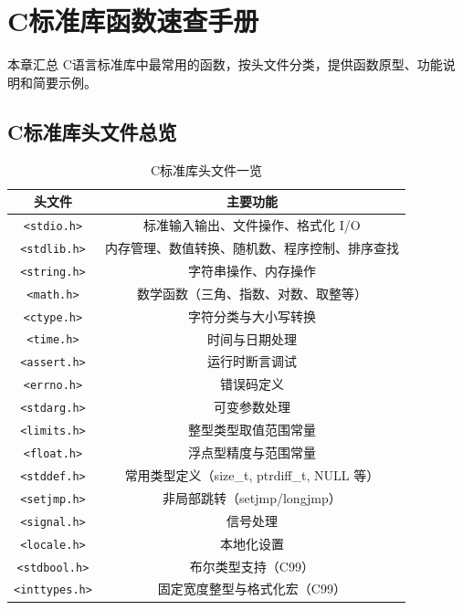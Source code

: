 \appendix
\clearpage
\begingroup
\let\clearpage\relax
\let\cleardoublepage\relax
\vspace*{\fill}
\chapter{C标准库函数速查手册}
\begin{center}
本章汇总 C语言标准库中最常用的函数，按头文件分类，提供函数原型、功能说明和简要示例。
\end{center}
\vspace*{\fill}
\endgroup
\clearpage


\section{C标准库头文件总览}

\begin{table}[H]
\centering
\small
\renewcommand{\arraystretch}{1.5}
\begin{tabulary}{\linewidth}{CC}
\toprule
\textbf{头文件} & \textbf{主要功能} \\ \midrule
\texttt{<stdio.h>} & 标准输入输出、文件操作、格式化 I/O \\ 
\texttt{<stdlib.h>} & 内存管理、数值转换、随机数、程序控制、排序查找 \\ 
\texttt{<string.h>} & 字符串操作、内存操作 \\ 
\texttt{<math.h>} & 数学函数（三角、指数、对数、取整等） \\ 
\texttt{<ctype.h>} & 字符分类与大小写转换 \\ 
\texttt{<time.h>} & 时间与日期处理 \\ 
\texttt{<assert.h>} & 运行时断言调试 \\ 
\texttt{<errno.h>} & 错误码定义 \\ 
\texttt{<stdarg.h>} & 可变参数处理 \\ 
\texttt{<limits.h>} & 整型类型取值范围常量 \\ 
\texttt{<float.h>} & 浮点型精度与范围常量 \\ 
\texttt{<stddef.h>} & 常用类型定义（size\_t, ptrdiff\_t, NULL 等） \\ 
\texttt{<setjmp.h>} & 非局部跳转（setjmp/longjmp） \\ 
\texttt{<signal.h>} & 信号处理 \\ 
\texttt{<locale.h>} & 本地化设置 \\ 
\texttt{<stdbool.h>} & 布尔类型支持（C99） \\ 
\texttt{<inttypes.h>} & 固定宽度整型与格式化宏（C99） \\ \bottomrule
\end{tabulary}
\caption{C标准库头文件一览}
\label{tab:stdlib_overview}
\end{table}

